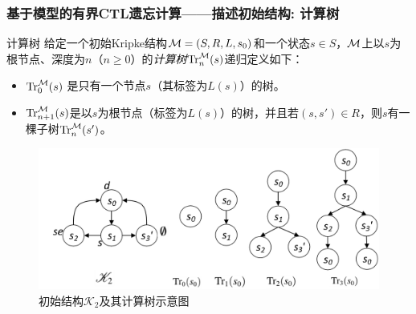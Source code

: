 \documentclass[9pt, CJK]{beamer}
\begin{document}
\begin{frame}
	\frametitle{基于模型的有界CTL遗忘计算——{\footnotesize 描述初始结构: 计算树}}
	{\footnotesize 
			\begin{block}{计算树}
			给定一个初始Kripke结构${\cal M}=(S,R,L,s_0)$和一个状态$s\in S$，${\cal M}$上以$s$为根节点、深度为$n$（$n\ge 0$）的\emph{计算树}$\textrm{Tr}_n^{{\cal M}}(s)$递归定义如下\cite{browne1988characterizing}：
			\begin{itemize}
				\item $\textrm{Tr}_0^{{\cal M}}(s)$ 是只有一个节点$s$（其标签为$L(s)$）的树。
				\item $\textrm{Tr}_{n+1}^{{\cal M}}(s)$是以$s$为根节点（标签为$L(s)$）的树，并且若$(s,s')\in R$，则$s$有一棵子树$\textrm{Tr}_{n}^{{\cal M}}(s')$。
			\end{itemize}
		\end{block} 
	\begin{figure}
		\includegraphics[scale=0.4]{figures/NK2Tree2}
		\caption{{\footnotesize 初始结构$\mathcal{K}_2$及其计算树示意图}}\label{fig:K2Tree}
	\end{figure}
}
\end{frame}
\end{document}
